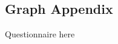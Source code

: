 
\begin{appendices}

\section{Graph Appendix}
\label{appendix:teachersquestions}
Questionnaire here
\end{appendices}
